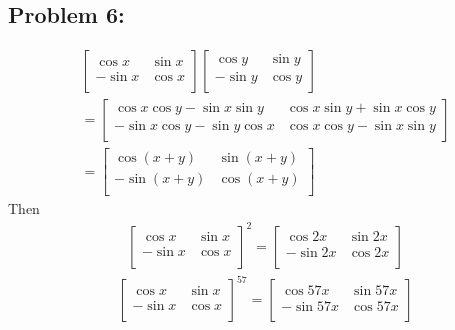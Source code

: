 \documentclass{article}
\begin{document}
\subsection*{{Problem 6: }}
\label{}
\begin{align*} 
&\left[   \begin{array}{cc} 
\cos x & \sin x \\ 
-\sin x & \cos x \\ 
\end{array}  \right] \left[ \begin{array}{cc}
\cos y & \sin y \\ 
-\sin y & \cos y \\ 
\end{array}  \right] \\&= \left[   \begin{array}{cc} 
\cos x\cos y -\sin x\sin y & \cos x\sin y + \sin x\cos y \\ 
-\sin x\cos y-\sin y\cos x &\cos x\cos y -\sin x\sin y\\ 
\end{array}  \right] \\&= \left[   \begin{array}{cc} 
\cos (x+y) & \sin (x+y) \\ 
-\sin (x+y) & \cos (x+y) \\ 
\end{array}  \right]
\end{align*}
Then \begin{align*} 
&\left[   \begin{array}{cc} 
\cos x & \sin x \\ 
-\sin x & \cos x \\ 
\end{array}  \right]^2 = \left[   \begin{array}{cc} 
\cos 2x & \sin 2x \\ 
-\sin 2x & \cos 2x \\ 
\end{array}  \right]
\end{align*}
\begin{align*} 
&\left[   \begin{array}{cc} 
\cos x & \sin x \\ 
-\sin x & \cos x \\ 
\end{array}  \right]^{57} = \left[   \begin{array}{cc} 
\cos 57x & \sin 57x \\ 
-\sin 57x & \cos 57x \\ 
\end{array}  \right]
\end{align*}
\end{document}
